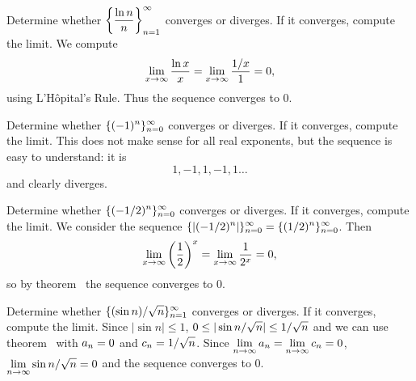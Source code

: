 \begin{example}
Determine whether $\displaystyle\bigg\{{\ln n\over n}\bigg\}_{n=1}^\infty$ converges or
diverges. If it converges, compute the limit. We compute
$$\lim_{x\to\infty}{\ln x\over x}=\lim_{x\to\infty}{1/x\over 1}=
0,$$
using L'H\^opital's Rule. 
Thus the sequence converges to 0.
\end{example}

\begin{example}
Determine whether $\displaystyle\{(-1)^n\}_{n=0}^\infty$ converges or
diverges. If it converges, compute the limit. This does not make sense
for all real exponents, but the sequence is easy to understand: it is
$$1,-1,1,-1,1\ldots$$
and clearly diverges.
\end{example}
\label{example:alternating ones}

\begin{example}
Determine whether $\displaystyle\{(-1/2)^n\}_{n=0}^\infty$ converges or
diverges. If it converges, compute the limit. We consider the sequence 
$\displaystyle\{|(-1/2)^n|\}_{n=0}^\infty=\{(1/2)^n\}_{n=0}^\infty$.
Then
$$
  \lim_{x\to\infty}\left({1\over2}\right)^x=\lim_{x\to\infty}{1\over2^x}=0,
$$
so by theorem~ the sequence converges to 0.
\end{example}

\begin{example}
Determine whether $\displaystyle\{(\sin n)/\sqrt{n}\}_{n=1}^\infty$ converges or
diverges. If it converges, compute the limit. 
Since $|\sin n|\le 1$, $\displaystyle 0\le|\sin n/\sqrt{n}|\le
1/\sqrt{n}$ and we can use theorem~ with $\displaystyle a_n=0$ and $\displaystyle c_n=1/\sqrt{n}$. Since
$\displaystyle\lim_{n\to\infty} a_n=\displaystyle\lim_{n\to\infty} c_n=0$, 
$\displaystyle\lim_{n\to\infty}\sin n/\sqrt{n}=0$ and the sequence converges to 0.
\end{example}


